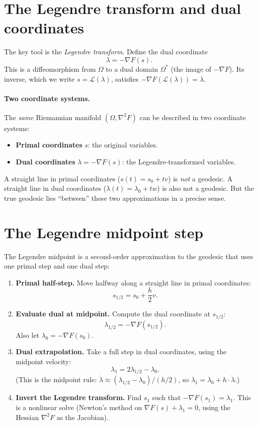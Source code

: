 \documentclass[11pt]{article}
\begin{document}
\section{The Legendre transform and dual coordinates}

The key tool is the \emph{Legendre transform}.  Define the dual
coordinate
\[
  \lambda = -\nabla F(s).
\]
This is a diffeomorphism from $\Omega$ to a dual domain $\Omega^*$
(the image of $-\nabla F$).  Its inverse, which we write
$s = \mathcal{L}(\lambda)$, satisfies $-\nabla F(\mathcal{L}(\lambda)) = \lambda$.

\paragraph{Two coordinate systems.}
The \emph{same} Riemannian manifold $(\Omega, \nabla^2 F)$ can be
described in two coordinate systems:
\begin{itemize}
  \item \textbf{Primal coordinates} $s$: the original variables.
  \item \textbf{Dual coordinates} $\lambda = -\nabla F(s)$: the
    Legendre-transformed variables.
\end{itemize}
A straight line in primal coordinates ($s(t) = s_0 + tv$) is
\emph{not} a geodesic.  A straight line in dual coordinates
($\lambda(t) = \lambda_0 + tw$) is also not a geodesic.  But
the true geodesic lies ``between'' these two approximations in a
precise sense.

\section{The Legendre midpoint step}

The Legendre midpoint is a second-order approximation to the geodesic
that uses one primal step and one dual step:

\begin{enumerate}
  \item \textbf{Primal half-step.}  Move halfway along a straight
    line in primal coordinates:
    \[
      s_{1/2} = s_0 + \frac{h}{2} v.
    \]

  \item \textbf{Evaluate dual at midpoint.}  Compute the dual
    coordinate at $s_{1/2}$:
    \[
      \lambda_{1/2} = -\nabla F(s_{1/2}).
    \]
    Also let $\lambda_0 = -\nabla F(s_0)$.

  \item \textbf{Dual extrapolation.}  Take a full step in dual
    coordinates, using the midpoint velocity:
    \[
      \lambda_1 = 2\lambda_{1/2} - \lambda_0.
    \]
    (This is the midpoint rule: $\dot\lambda \approx (\lambda_{1/2} - \lambda_0)/(h/2)$,
    so $\lambda_1 = \lambda_0 + h \cdot \dot\lambda$.)

  \item \textbf{Invert the Legendre transform.}  Find $s_1$ such that
    $-\nabla F(s_1) = \lambda_1$.  This is a nonlinear solve
    (Newton's method on $\nabla F(s) + \lambda_1 = 0$, using the
    Hessian $\nabla^2 F$ as the Jacobian).
\end{enumerate}
\end{document}
